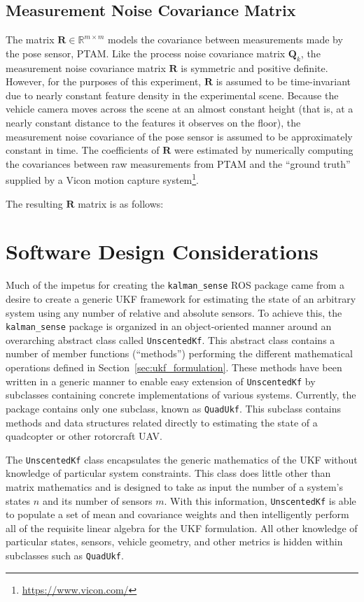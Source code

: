 \subsection{Measurement Noise Covariance Matrix} \label{sec:R_Matrix}
The matrix $\mathbf{R} \in \mathbb{R}^{m \times m}$ models the covariance between measurements made by the pose sensor, PTAM. Like the process noise covariance matrix $\mathbf{Q}_{k}$, the measurement noise covariance matrix $\mathbf{R}$ is symmetric and positive definite. However, for the purposes of this experiment, $\mathbf{R}$ is assumed to be time-invariant due to nearly constant feature density in the experimental scene. Because the vehicle camera moves across the scene at an almost constant height (that is, at a nearly constant distance to the features it observes on the floor), the measurement noise covariance of the pose sensor is assumed to be approximately constant in time. The coefficients of $\mathbf{R}$ were estimated by numerically computing the covariances between raw measurements from PTAM and the ``ground truth'' supplied by a Vicon motion capture system\footnote{\url{https://www.vicon.com/}}.

The resulting $\mathbf{R}$ matrix is as follows:
%

\section{Software Design Considerations}

Much of the impetus for creating the \texttt{kalman\_sense} ROS package came from a desire to create a generic UKF framework for estimating the state of an arbitrary system using any number of relative and absolute sensors. To achieve this, the \texttt{kalman\_sense} package is organized in an object-oriented manner around an overarching abstract class called \texttt{UnscentedKf}. This abstract class contains a number of member functions (``methods'') performing the different mathematical operations defined in Section~\ref{sec:ukf_formulation}. These methods have been written in a generic manner to enable easy extension of \texttt{UnscentedKf} by subclasses containing concrete implementations of various systems. Currently, the package contains only one subclass, known as \texttt{QuadUkf}. This subclass contains methods and data structures related directly to estimating the state of a quadcopter or other rotorcraft UAV.

The \texttt{UnscentedKf} class encapsulates the generic mathematics of the UKF without knowledge of particular system constraints. This class does little other than matrix mathematics and is designed to take as input the number of a system's states $n$ and its number of sensors $m$. With this information, \texttt{UnscentedKf} is able to populate a set of mean and covariance weights and then intelligently perform all of the requisite linear algebra for the UKF formulation. All other knowledge of particular states, sensors, vehicle geometry, and other metrics is hidden within subclasses such as \texttt{QuadUkf}.

